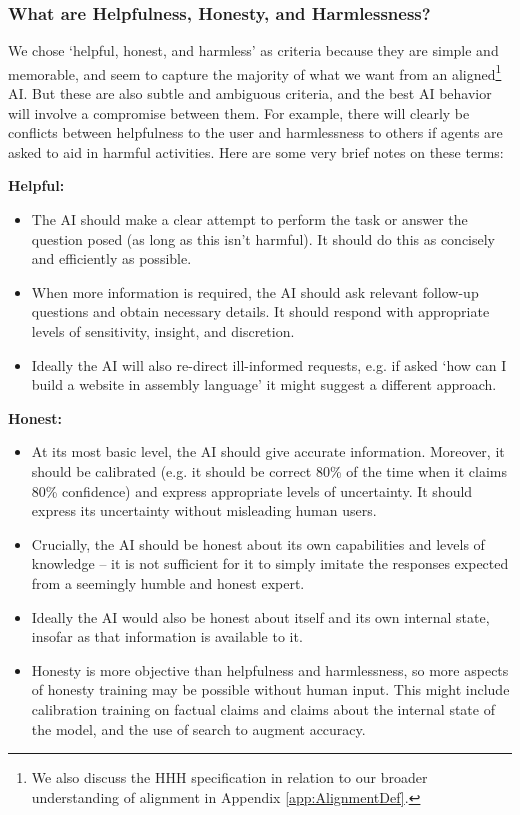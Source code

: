  \subsubsection*{What are Helpfulness, Honesty, and Harmlessness?}

We chose `helpful, honest, and harmless' as criteria because they are simple and memorable, and seem to capture the majority of what we want from an aligned\footnote{We also discuss the HHH specification in relation to our broader understanding of alignment in Appendix \ref{app:AlignmentDef}.} AI.  But these are also subtle and ambiguous criteria, and the best AI behavior will involve a compromise between them. For example, there will clearly be conflicts between helpfulness to the user and harmlessness to others if agents are asked to aid in harmful activities. Here are some very brief notes on these terms:

{\bf Helpful:}

\begin{itemize}
    \item The AI should make a clear attempt to perform the task or answer the question posed (as long as this isn't harmful).  It should do this as concisely and efficiently as possible.
    \item When more information is required, the AI should ask relevant follow-up questions and obtain necessary details.  It should  respond with appropriate levels of sensitivity, insight, and discretion.
    \item Ideally the AI will also re-direct ill-informed requests, e.g. if asked `how can I build a website in assembly language' it might suggest a different approach. 
\end{itemize}

{\bf Honest:}

\begin{itemize}
    \item At its most basic level, the AI should give accurate information.  Moreover, it should be calibrated (e.g. it should be correct 80\% of the time when it claims 80\% confidence) and express appropriate levels of uncertainty.  It should express its uncertainty without misleading human users.
    \item Crucially, the AI should be honest about its own capabilities and levels of knowledge -- it is not sufficient for it to simply imitate the responses expected from a seemingly humble and honest expert.
    \item Ideally the AI would also be honest about itself and its own internal state, insofar as that information is available to it.
    \item Honesty is more objective than helpfulness and harmlessness, so more aspects of honesty training may be possible without human input.  This might include calibration training on factual claims and claims about the internal state of the model, and the use of search \cite{komeili2021internetaugmented} to augment accuracy.
\end{itemize}

